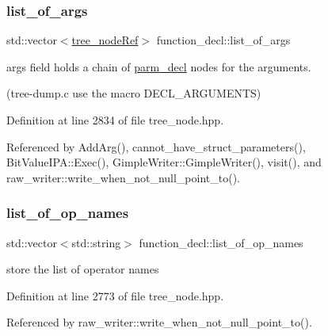 \subsubsection{\texorpdfstring{list\+\_\+of\+\_\+args}{list\_of\_args}}
{\footnotesize\ttfamily std\+::vector$<$\hyperlink{tree__node_8hpp_a6ee377554d1c4871ad66a337eaa67fd5}{tree\+\_\+node\+Ref}$>$ function\+\_\+decl\+::list\+\_\+of\+\_\+args}



args field holds a chain of \hyperlink{structparm__decl}{parm\+\_\+decl} nodes for the arguments. 

(tree-\/dump.\+c use the macro D\+E\+C\+L\+\_\+\+A\+R\+G\+U\+M\+E\+N\+TS) 

Definition at line 2834 of file tree\+\_\+node.\+hpp.



Referenced by Add\+Arg(), cannot\+\_\+have\+\_\+struct\+\_\+parameters(), Bit\+Value\+I\+P\+A\+::\+Exec(), Gimple\+Writer\+::\+Gimple\+Writer(), visit(), and raw\+\_\+writer\+::write\+\_\+when\+\_\+not\+\_\+null\+\_\+point\+\_\+to().

\mbox{\label{structfunction__decl_aaca92cfb750abe4017ad73a76d354ca0}} 
\subsubsection{\texorpdfstring{list\+\_\+of\+\_\+op\+\_\+names}{list\_of\_op\_names}}
{\footnotesize\ttfamily std\+::vector$<$std\+::string$>$ function\+\_\+decl\+::list\+\_\+of\+\_\+op\+\_\+names}



store the list of operator names 



Definition at line 2773 of file tree\+\_\+node.\+hpp.



Referenced by raw\+\_\+writer\+::write\+\_\+when\+\_\+not\+\_\+null\+\_\+point\+\_\+to().

\mbox{\label{structfunction__decl_a196f8d7f98a53b4c2c28763a12b0c979}} 
